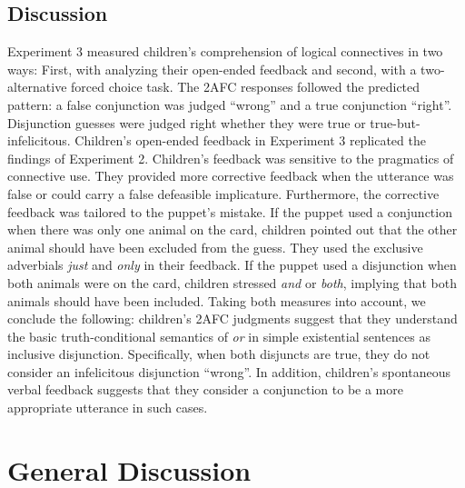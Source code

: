 \documentclass[
  english,
  ,man,floatsintext]{apa6}
\begin{document}
\hypertarget{discussion-2}{%
\subsection{Discussion}\label{discussion-2}}

Experiment 3 measured children's comprehension of logical connectives in two ways: First, with analyzing their open-ended feedback and second, with a two-alternative forced choice task. The 2AFC responses followed the predicted pattern: a false conjunction was judged \enquote{wrong} and a true conjunction \enquote{right}. Disjunction guesses were judged right whether they were true or true-but-infelicitous. Children's open-ended feedback in Experiment 3 replicated the findings of Experiment 2. Children's feedback was sensitive to the pragmatics of connective use. They provided more corrective feedback when the utterance was false or could carry a false defeasible implicature. Furthermore, the corrective feedback was tailored to the puppet's mistake. If the puppet used a conjunction when there was only one animal on the card, children pointed out that the other animal should have been excluded from the guess. They used the exclusive adverbials \emph{just} and \emph{only} in their feedback. If the puppet used a disjunction when both animals were on the card, children stressed \emph{and} or \emph{both}, implying that both animals should have been included. Taking both measures into account, we conclude the following: children's 2AFC judgments suggest that they understand the basic truth-conditional semantics of \emph{or} in simple existential sentences as inclusive disjunction. Specifically, when both disjuncts are true, they do not consider an infelicitous disjunction \enquote{wrong}. In addition, children's spontaneous verbal feedback suggests that they consider a conjunction to be a more appropriate utterance in such cases.

\hypertarget{general-discussion}{%
\section{General Discussion}\label{general-discussion}}
\end{document}
